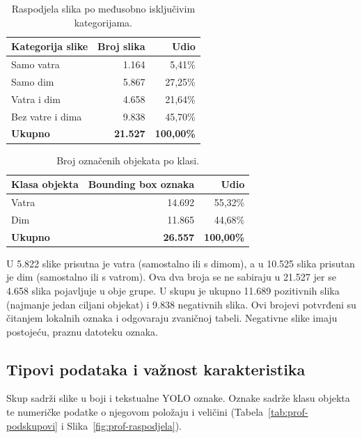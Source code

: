 \begin{table}[H]
\centering
\small
\begin{tabular}{@{}lrr@{}}
\toprule
\textbf{Kategorija slike} & \textbf{Broj slika} & \textbf{Udio}\\
\midrule
Samo vatra & 1.164 & 5,41\%\\
Samo dim & 5.867 & 27,25\%\\
Vatra i dim & 4.658 & 21,64\%\\
Bez vatre i dima & 9.838 & 45,70\%\\
\midrule
\textbf{Ukupno} & \textbf{21.527} & \textbf{100,00\%}\\
\bottomrule
\end{tabular}
\caption{Raspodjela slika po međusobno isključivim kategorijama.}
\label{tab:prof-kategorije}
\end{table}

\begin{table}[H]
\centering
\small
\begin{tabular}{@{}lrr@{}}
\toprule
\textbf{Klasa objekta} & \textbf{Bounding box oznaka} & \textbf{Udio}\\
\midrule
Vatra & 14.692 & 55,32\%\\
Dim & 11.865 & 44,68\%\\
\midrule
\textbf{Ukupno} & \textbf{26.557} & \textbf{100,00\%}\\
\bottomrule
\end{tabular}
\caption{Broj označenih objekata po klasi.}
\label{tab:prof-objekti}
\end{table}

U 5.822 slike prisutna je vatra (samostalno ili s dimom), a u 10.525 slika prisutan je dim (samostalno ili s vatrom). Ova dva broja se ne sabiraju u 21.527 jer se 4.658 slika pojavljuje u obje grupe. U skupu je ukupno 11.689 pozitivnih slika (najmanje jedan ciljani objekat) i 9.838 negativnih slika. Ovi brojevi potvrđeni su čitanjem lokalnih oznaka i odgovaraju zvaničnoj tabeli. Negativne slike imaju postojeću, praznu datoteku oznaka.

\subsection{Tipovi podataka i važnost karakteristika}
Skup sadrži slike u boji i tekstualne YOLO oznake. Oznake sadrže klasu objekta te numeričke podatke o njegovom položaju i veličini (Tabela~\ref{tab:prof-podskupovi} i Slika~\ref{fig:prof-raspodjela}).

